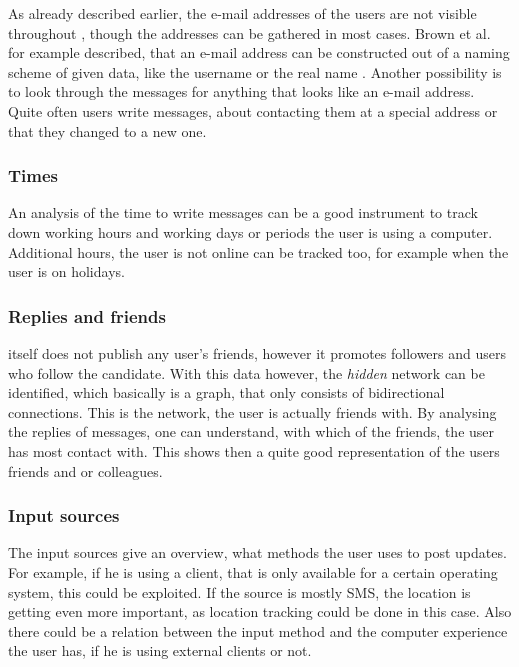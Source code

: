 As already described earlier, the e-mail addresses of the users are not visible
throughout \Twitter{}, though the addresses can be gathered in most cases.
Brown et al. for example described, that an e-mail address can be constructed out
of a naming scheme of given data, like the username or the real name
\cite{brown2008}. Another possibility is to look through the messages for
anything that looks like an e-mail address. Quite often users write messages,
about contacting them at a special address or that they changed to a new one.

\subsubsection{Times}

An analysis of the time to write messages can be a good instrument to track
down working hours and working days or periods the user is using a computer.
Additional hours, the user is not online can be tracked too, for example
when the user is on holidays.

\subsubsection{Replies and friends}

\Twitter{} itself does not publish any user's friends, however it promotes
followers and users who follow the candidate. With this data however, the
\textit{hidden} network can be identified, which basically is a graph, that
only consists of bidirectional connections. This is the network, the user is
actually friends with. By analysing the replies of messages, one can
understand, with which of the friends, the user has most contact with. This
shows then a quite good representation of the users friends and or colleagues.

\subsubsection{Input sources}

The \Twitter{} input sources give an overview, what methods the user uses to
post updates. For example, if he is using a \Twitter{} client, that is only
available for a certain operating system, this could be exploited. If the
source is mostly SMS, the location is getting even more important, as location
tracking could be done in this case. Also there could be a relation between the
input method and the computer experience the user has, if he is using external
clients or not.

